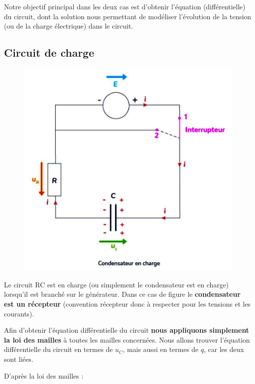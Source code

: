 \documentclass[11pt,a4paper]{article}
\begin{document}
Notre objectif principal dans les deux cas est d'obtenir l'équation (différentielle) du circuit, dont la solution nous permettant de modéliser l'évolution de la tension (ou de la charge électrique) dans le circuit. 

\subsection{Circuit de charge}

\begingroup
\setlength{\intextsep}{-15pt}%
\begin{figure}
  \centering\includegraphics[width=\linewidth]{imgs/p7/RCcharge.jpg}
\end{figure}

Le circuit RC est en charge (ou simplement le condensateur est en charge) lorsqu'il est branché sur le générateur. Dans ce cas de figure le \textbf{condensateur est un récepteur} (convention récepteur donc à respecter pour les tensions et les courants). 

Afin d'obtenir l'équation différentielle du circuit \textbf{nous appliquons simplement la loi des mailles} à toutes les mailles concernées. Nous allons trouver l'équation différentielle du circuit en termes de $u_C$, mais aussi en termes de $q$, car les deux sont liées. 

\endgroup
\vspace{.5cm}
D'après la loi des mailles : 
\end{document}

